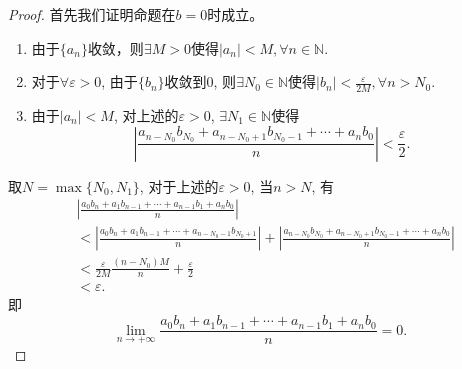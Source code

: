 \documentclass[utf8]{book}
\begin{document}
\begin{proof}
首先我们证明命题在$b=0$时成立。
\begin{enumerate}
\renewcommand\labelenumi{\normalfont(\theenumi)}
\item 由于$\{a_n\}$收敛，则$\exists M > 0$使得$|a_n| < M, \forall n \in \mathbb {N}$.
\item 对于$\forall \varepsilon > 0$, 由于$\{b_n\}$收敛到$0$, 则$\exists N_0 \in \mathbb {N}$使得$|b_n| < \frac{\varepsilon}{2M}, \forall n > N_0$.
\item 由于$|a_n| < M$, 对上述的$\varepsilon > 0$, $\exists N_1 \in \mathbb{N}$使得
$$\left|\frac{a_{n - N_0}b_{N_0} + a_{n - N_0 + 1}b_{N_0 - 1}+\cdots + a_nb_0}{n}\right| < \frac{\varepsilon}{2}.$$
\end{enumerate}
取$N = \max\{N_0, N_1\}$, 对于上述的$\varepsilon > 0$, 当$n > N$, 有
\begin{equation*}
\begin{split}
&\left | \frac{a_0b_n+a_1b_{n-1}+\cdots+a_{n-1}b_1+a_nb_0}{n} \right | \\
&< \left | \frac{a_0b_n+a_1b_{n-1}+\cdots+a_{n-N_0-1}b_{N_0+1}}{n}\right| 
+ \left | \frac{a_{n-N_0}b_{N_0}+ a_{n-N_0 + 1}b_{N_0-1}+\cdots+a_{n}b_0}{n}\right|\\
&< \frac{\varepsilon}{2M}\frac{(n - N_0)M}{n} + \frac{\varepsilon}{2}\\
&< \varepsilon.
	\end{split}
\end{equation*}
即$$\displaystyle \lim_{n\to +\infty}\frac{a_0b_n+a_1b_{n-1}+\cdots+a_{n-1}b_1+a_nb_0}{n}= 0.$$


\end{proof}
\end{document}
